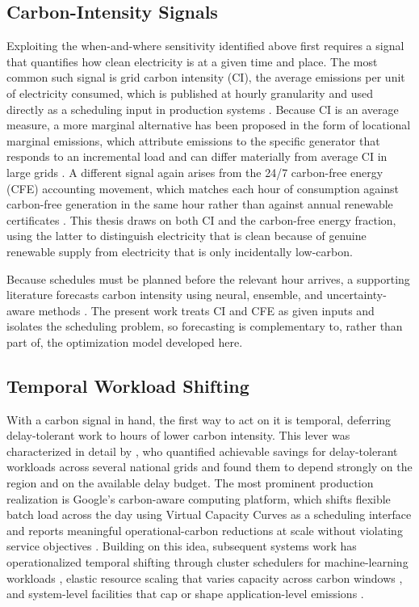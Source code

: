 \subsection{Carbon-Intensity Signals}
\label{sec:lr-signals}

Exploiting the when-and-where sensitivity identified above first requires a signal that quantifies how clean electricity is at a given time and place. The most common such signal is grid carbon intensity (CI), the average emissions per unit of electricity consumed, which is published at hourly granularity and used directly as a scheduling input in production systems \citep{radovanovic2023}. Because CI is an average measure, a more marginal alternative has been proposed in the form of locational marginal emissions, which attribute emissions to the specific generator that responds to an incremental load and can differ materially from average CI in large grids \citep{cote2024locational, lindberg2022geographic}. A different signal again arises from the 24/7 carbon-free energy (CFE) accounting movement, which matches each hour of consumption against carbon-free generation in the same hour rather than against annual renewable certificates \citep{riepin2024cfe247costs}. This thesis draws on both CI and the carbon-free energy fraction, using the latter to distinguish electricity that is clean because of genuine renewable supply from electricity that is only incidentally low-carbon.

Because schedules must be planned before the relevant hour arrives, a supporting literature forecasts carbon intensity using neural, ensemble, and uncertainty-aware methods \citep{maji2022carboncast, yan2025ensembleci, li2024uncertainty}. The present work treats CI and CFE as given inputs and isolates the scheduling problem, so forecasting is complementary to, rather than part of, the optimization model developed here.

\subsection{Temporal Workload Shifting}
\label{sec:lr-temporal}

With a carbon signal in hand, the first way to act on it is temporal, deferring delay-tolerant work to hours of lower carbon intensity. This lever was characterized in detail by \citet{wiesner2021letswait}, who quantified achievable savings for delay-tolerant workloads across several national grids and found them to depend strongly on the region and on the available delay budget. The most prominent production realization is Google's carbon-aware computing platform, which shifts flexible batch load across the day using Virtual Capacity Curves as a scheduling interface and reports meaningful operational-carbon reductions at scale without violating service objectives \citep{radovanovic2023}. Building on this idea, subsequent systems work has operationalized temporal shifting through cluster schedulers for machine-learning workloads \citep{xu2025green}, elastic resource scaling that varies capacity across carbon windows \citep{hanafy2025}, and system-level facilities that cap or shape application-level emissions \citep{thiede2023carboncontainers, souza2023ecovisor}.

